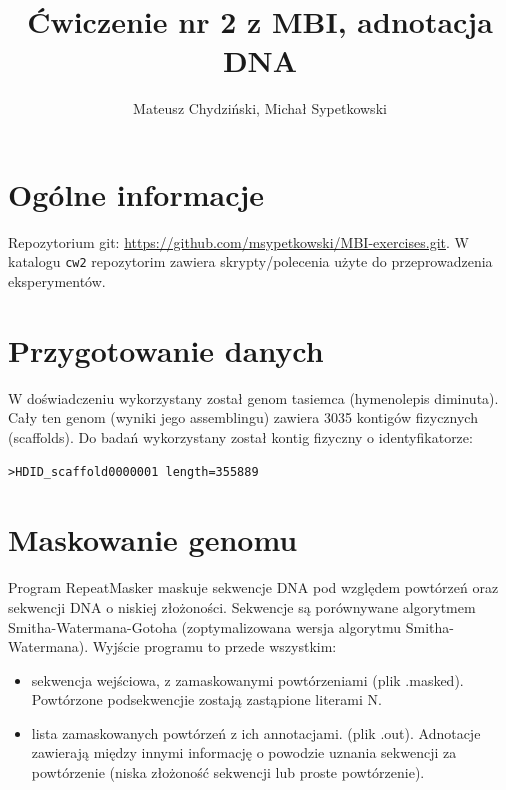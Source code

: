 \documentclass[a4paper]{article}
\begin{document}
\title{Ćwiczenie nr 2 z MBI, adnotacja DNA}
\author{Mateusz Chydziński, Michał Sypetkowski}
\maketitle

\section{Ogólne informacje}
Repozytorium git: \url{https://github.com/msypetkowski/MBI-exercises.git}.
W katalogu \texttt{cw2} repozytorim zawiera skrypty/polecenia użyte do przeprowadzenia eksperymentów.

\section{Przygotowanie danych}
W doświadczeniu wykorzystany został genom tasiemca (hymenolepis diminuta).
Cały ten genom (wyniki jego assemblingu) zawiera 3035 kontigów fizycznych (scaffolds).
Do badań wykorzystany został kontig fizyczny o identyfikatorze:
\begin{verbatim}
>HDID_scaffold0000001 length=355889
\end{verbatim}

\section{Maskowanie genomu}

Program RepeatMasker maskuje sekwencje DNA pod względem powtórzeń oraz sekwencji DNA o niskiej złożoności.
Sekwencje są porównywane algorytmem Smitha-Watermana-Gotoha (zoptymalizowana wersja algorytmu Smitha-Watermana).
Wyjście programu to przede wszystkim:
\begin{itemize}
    \item sekwencja wejściowa, z zamaskowanymi powtórzeniami (plik .masked).
             Powtórzone podsekwencjie zostają zastąpione literami N.
    \item lista zamaskowanych powtórzeń z ich annotacjami.
            (plik .out).
            Adnotacje zawierają między innymi informację o powodzie uznania sekwencji za powtórzenie
            (niska złożoność sekwencji lub proste powtórzenie).
\end{itemize}
\end{document}
